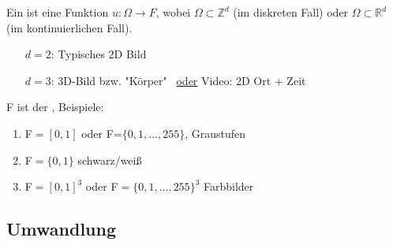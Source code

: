         \begin{definition*}
            Ein  ist eine Funktion $u: \Omega \to F$, wobei $\Omega \subset \mathbb Z^d$ (im diskreten Fall) oder $\Omega \subset \mathbb R^d$ (im kontinuierlichen Fall).
            \begin{enumerate}
                \item[$d=2$:] Typisches 2D Bild
                \item[$d=3$:] 3D-Bild bzw. "Körper" \ \underline{oder} Video: 2D Ort + Zeit
            \end{enumerate}
            F ist der , Beispiele:
            \begin{enumerate}[label=\textbullet]
                \item F$=[0,1]$ oder F=$\{0,1,..., 255\}$, Graustufen
                \item F$=\{0,1\}$ schwarz/weiß
                \item F$=[0,1]^3$ oder F$=\{0,1,...,255\}^3$ Farbbilder
            \end{enumerate}
        \end{definition*}
    \subsection{Umwandlung}


